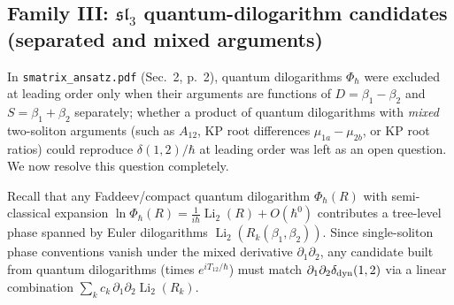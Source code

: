\documentclass[11pt,a4paper]{article}
\DeclareMathOperator{\Li}{Li}
\theoremstyle{remark}
\begin{document}
\subsection{Family III: \texorpdfstring{$\mathfrak{sl}_3$}{sl3} quantum-dilogarithm candidates (separated and mixed arguments)}
In \texttt{smatrix\_ansatz.pdf} (Sec.~2, p.~2), quantum dilogarithms $\Phi_\hbar$ were excluded at leading order only when their arguments are functions of $D=\beta_1-\beta_2$ and $S=\beta_1+\beta_2$ separately; whether a product of quantum dilogarithms with \emph{mixed} two-soliton arguments (such as $A_{12}$, KP root differences $\mu_{1a}-\mu_{2b}$, or KP root ratios) could reproduce $\delta(1,2)/\hbar$ at leading order was left as an open question. We now resolve this question completely.

Recall that any Faddeev/compact quantum dilogarithm $\Phi_\hbar(R)$ with semi-classical expansion $\ln\Phi_\hbar(R)=\frac{1}{i\hbar}\Li_2(R)+O(\hbar^0)$ contributes a tree-level phase spanned by Euler dilogarithms $\Li_2(R_k(\beta_1,\beta_2))$. Since single-soliton phase conventions vanish under the mixed derivative $\partial_1\partial_2$, any candidate built from quantum dilogarithms (times $e^{iT_{12}/\hbar}$) must match $\partial_1\partial_2\delta_{\rm dyn}(1,2)$ via a linear combination $\sum_k c_k\,\partial_1\partial_2\Li_2(R_k)$.
\end{document}
